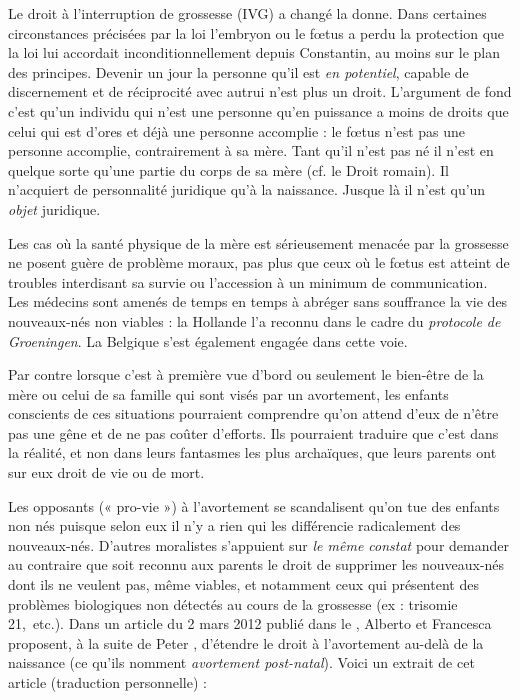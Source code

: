  Le droit à l'interruption de grossesse (IVG) a changé la donne. Dans certaines circonstances précisées par la loi l'embryon ou le fœtus a perdu la protection que la loi lui accordait inconditionnellement depuis Constantin, au moins sur le plan des principes. Devenir un jour la personne qu'il est \emph{en potentiel}, capable de discernement et de réciprocité avec autrui  n'est plus un droit. L'argument de fond c'est qu'un individu qui n'est une personne qu'en puissance a moins de droits que celui qui est d'ores et déjà une personne accomplie : le fœtus n'est pas une personne accomplie, contrairement à sa mère. Tant qu'il n'est pas né il n'est en quelque sorte qu'une partie du corps de sa mère (cf. le Droit romain). Il n'acquiert de personnalité juridique qu'à la naissance. Jusque là il n'est qu'un \emph{objet} juridique. 

 Les cas où la santé physique de la mère est sérieusement menacée par la grossesse ne posent guère de problème moraux, pas plus que ceux où le fœtus est atteint de troubles interdisant sa survie ou l'accession à un minimum de communication. Les médecins sont amenés de temps en temps à abréger sans souffrance la vie des nouveaux-nés non viables : la Hollande l'a reconnu dans le cadre du \emph{protocole de Groeningen}. La Belgique s'est également engagée dans cette voie. 
 
 Par contre lorsque c'est à première vue d'bord ou seulement le bien-être de la mère ou celui de sa famille qui sont visés par un avortement, les enfants conscients de ces situations pourraient comprendre qu'on attend d'eux de n'être pas une gêne et de ne pas coûter d'efforts. Ils pourraient traduire que c'est dans la réalité, et non dans leurs fantasmes les plus archaïques, que leurs parents ont sur eux droit de vie ou de mort.

 Les opposants (« pro-vie ») à l'avortement se scandalisent qu'on tue des enfants non nés puisque selon eux il n'y a rien qui les différencie radicalement des nouveaux-nés. D'autres moralistes s'appuient sur  \emph{le même constat} pour demander au contraire que soit reconnu aux parents le droit de supprimer les nouveaux-nés dont ils ne veulent pas, même viables, et notamment ceux qui présentent des problèmes biologiques non détectés au cours de la grossesse (ex : trisomie 21,~etc.). Dans un article du 2 mars 2012 publié dans le , Alberto  et Francesca  proposent, à la suite de Peter , d'étendre le droit à l'avortement au-delà de la naissance (ce qu'ils nomment \emph{avortement post-natal}). Voici un extrait de cet article (traduction personnelle) :

